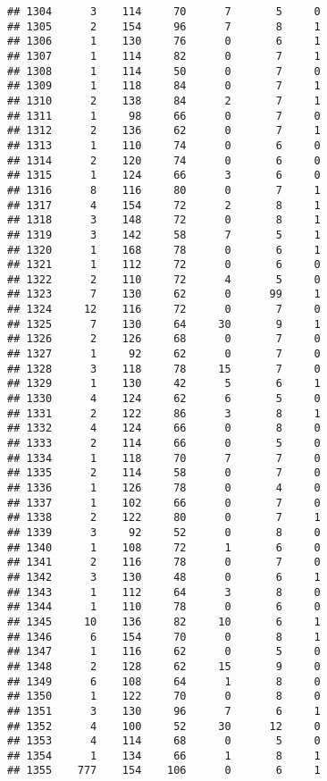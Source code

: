 \documentclass[
]{article}
\begin{document}
\begin{verbatim}
## 1304      3    114     70      7       5     0
## 1305      2    154     96      7       8     1
## 1306      1    130     76      0       6     1
## 1307      1    114     82      0       7     1
## 1308      1    114     50      0       7     0
## 1309      1    118     84      0       7     1
## 1310      2    138     84      2       7     1
## 1311      1     98     66      0       7     0
## 1312      2    136     62      0       7     1
## 1313      1    110     74      0       6     0
## 1314      2    120     74      0       6     0
## 1315      1    124     66      3       6     0
## 1316      8    116     80      0       7     1
## 1317      4    154     72      2       8     1
## 1318      3    148     72      0       8     1
## 1319      3    142     58      7       5     1
## 1320      1    168     78      0       6     1
## 1321      1    112     72      0       6     0
## 1322      2    110     72      4       5     0
## 1323      7    130     62      0      99     1
## 1324     12    116     72      0       7     0
## 1325      7    130     64     30       9     1
## 1326      2    126     68      0       7     0
## 1327      1     92     62      0       7     0
## 1328      3    118     78     15       7     0
## 1329      1    130     42      5       6     1
## 1330      4    124     62      6       5     0
## 1331      2    122     86      3       8     1
## 1332      4    124     66      0       8     0
## 1333      2    114     66      0       5     0
## 1334      1    118     70      7       7     0
## 1335      2    114     58      0       7     0
## 1336      1    126     78      0       4     0
## 1337      1    102     66      0       7     0
## 1338      2    122     80      0       7     1
## 1339      3     92     52      0       8     0
## 1340      1    108     72      1       6     0
## 1341      2    116     78      0       7     0
## 1342      3    130     48      0       6     1
## 1343      1    112     64      3       8     0
## 1344      1    110     78      0       6     0
## 1345     10    136     82     10       6     1
## 1346      6    154     70      0       8     1
## 1347      1    116     62      0       5     0
## 1348      2    128     62     15       9     0
## 1349      6    108     64      1       8     0
## 1350      1    122     70      0       8     0
## 1351      3    130     96      7       6     1
## 1352      4    100     52     30      12     0
## 1353      4    114     68      0       5     0
## 1354      1    134     66      1       8     1
## 1355    777    154    106      0       6     1

\end{verbatim}
\end{document}
